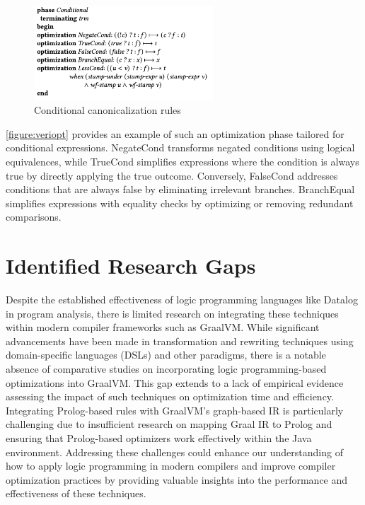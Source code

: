 \begin{figure}[h]
    \centering
    \includegraphics[width=0.6\textwidth]{Packages/veriopt.png}
    \caption{Conditional canonicalization rules \cite{Webb2023}}
    \label{figure:veriopt}
\end{figure}

\autoref{figure:veriopt} provides an example of such an optimization phase tailored for conditional expressions. NegateCond transforms negated conditions using logical equivalences, while TrueCond simplifies expressions where the condition is always true by directly applying the true outcome. Conversely, FalseCond addresses conditions that are always false by eliminating irrelevant branches. BranchEqual simplifies expressions with equality checks by optimizing or removing redundant comparisons.

\section{Identified Research Gaps}
Despite the established effectiveness of logic programming languages like Datalog in program analysis, there is limited research on integrating these techniques within modern compiler frameworks such as GraalVM. While significant advancements have been made in transformation and rewriting techniques using domain-specific languages (DSLs) and other paradigms, there is a notable absence of comparative studies on incorporating logic programming-based optimizations into GraalVM. This gap extends to a lack of empirical evidence assessing the impact of such techniques on optimization time and efficiency. Integrating Prolog-based rules with GraalVM’s graph-based IR is particularly challenging due to insufficient research on mapping Graal IR to Prolog and ensuring that Prolog-based optimizers work effectively within the Java environment. Addressing these challenges could enhance our understanding of how to apply logic programming in modern compilers and improve compiler optimization practices by providing valuable insights into the performance and effectiveness of these techniques.
